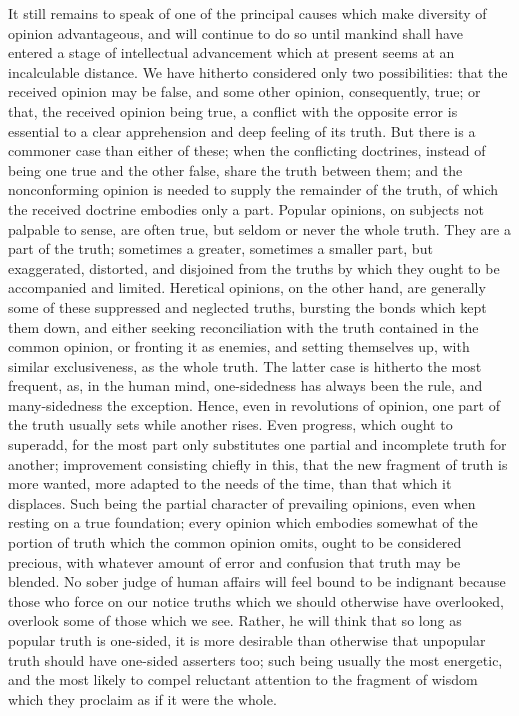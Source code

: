 \documentclass[12pt]{report}
\begin{document}
It still remains to speak of one of the principal causes which make diversity of opinion advantageous, and will continue to do so until mankind shall have entered a stage of intellectual advancement which at present seems at an incalculable distance. We have hitherto considered only two possibilities: that the received opinion may be false, and some other opinion, consequently, true; or that, the received opinion being true, a conflict with the opposite error is essential to a clear apprehension and deep feeling of its truth. But there is a commoner case than either of these; when the conflicting doctrines, instead of being one true and the other false, share the truth between them; and the nonconforming opinion is needed to supply the remainder of the truth, of which the received doctrine embodies only a part. Popular opinions, on subjects not palpable to sense, are often true, but seldom or never the whole truth. They are a part of the truth; sometimes a greater, sometimes a smaller part, but exaggerated, distorted, and disjoined from the truths by which they ought to be accompanied and limited. Heretical opinions, on the other hand, are generally some of these suppressed and neglected truths, bursting the bonds which kept them down, and either seeking reconciliation with the truth contained in the common opinion, or fronting it as enemies, and setting themselves up, with similar exclusiveness, as the whole truth. The latter case is hitherto the most frequent, as, in the human mind, one-sidedness has always been the rule, and many-sidedness the exception. Hence, even in revolutions of opinion, one part of the truth usually sets while another rises. Even progress, which ought to superadd, for the most part only substitutes one partial and incomplete truth for another; improvement consisting chiefly in this, that the new fragment of truth is more wanted, more adapted to the needs of the time, than that which it displaces. Such being the partial character of prevailing opinions, even when resting on a true foundation; every opinion which embodies somewhat of the portion of truth which the common opinion omits, ought to be considered precious, with whatever amount of error and confusion that truth may be blended. No sober judge of human affairs will feel bound to be indignant because those who force on our notice truths which we should otherwise have overlooked, overlook some of those which we see. Rather, he will think that so long as popular truth is one-sided, it is more desirable than otherwise that unpopular truth should have one-sided asserters too; such being usually the most energetic, and the most likely to compel reluctant attention to the fragment of wisdom which they proclaim as if it were the whole.
\end{document}

